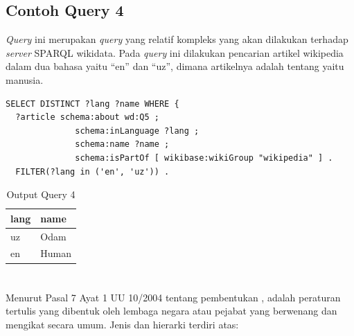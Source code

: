 \subsection{Contoh Query 4}
\label{sec:contoh-query-4}

\textit{Query} ini merupakan \textit{query} yang relatif kompleks yang akan dilakukan terhadap
\textit{server} SPARQL wikidata. Pada \textit{query} ini dilakukan pencarian artikel wikipedia dalam
dua bahasa yaitu ``en'' dan ``uz'', dimana artikelnya adalah tentang  yaitu manusia.

\begin{listing}[H]
  \begin{verbatim}
SELECT DISTINCT ?lang ?name WHERE {
  ?article schema:about wd:Q5 ;
              schema:inLanguage ?lang ;
              schema:name ?name ;
              schema:isPartOf [ wikibase:wikiGroup "wikipedia" ] .
  FILTER(?lang in ('en', 'uz')) .
  \end{verbatim}
  \caption{Query 4}
  \label{lst:query-4}
\end{listing}

\begin{table}
  \centering
  \begin{tabular}{|l|l|} \hline
    lang & name \\ \hline \hline
    uz & Odam \\ \hline
    en & Human \\ \hline
  \end{tabular}
  \caption{Output Query 4}
  \label{tab:output-query-4}
\end{table}

\section{\Legal}
\label{sec:legal}

Menurut Pasal 7 Ayat 1 UU 10/2004 tentang pembentukan \legal, \legal adalah peraturan tertulis yang
dibentuk oleh lembaga negara atau pejabat yang berwenang dan mengikat secara umum. Jenis dan
hierarki \legal terdiri atas:

